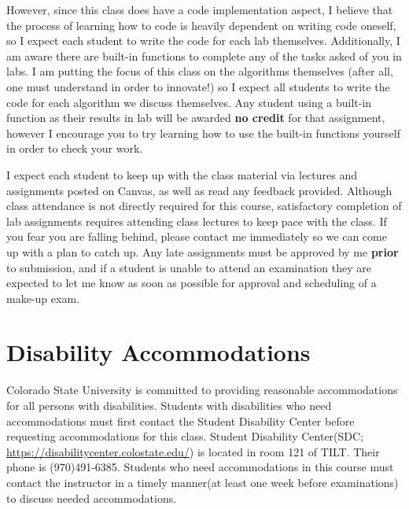 \documentclass[11pt]{article}
\begin{document}
\noindent However, since this class does have a code implementation aspect, I believe that the process of learning how to code is heavily dependent on writing code oneself, so I expect each student to write the code for each lab themselves. Additionally, I am aware there are built-in functions to complete any of the tasks asked of you in labs. I am putting the focus of this class on the algorithms themselves (after all, one must understand in order to innovate!) so I expect all students to write the code for each algorithm we discuss themselves. Any student using a built-in function as their results in lab will be awarded \textbf{no credit} for that assignment, however I encourage you to try learning how to use the built-in functions yourself in order to check your work.

\bigskip

\noindent I expect each student to keep up with the class material via lectures and assignments posted on Canvas, as well as read any feedback provided. Although class attendance is not directly required for this course, satisfactory completion of lab assignments requires attending class lectures to keep pace with the class. If you fear you are falling behind, please contact me immediately so we can come up with a plan to catch up. Any late assignments must be approved by me \textbf{prior} to submission, and if a student is unable to attend an examination they are expected to let me know as soon as possible for approval and scheduling of a make-up exam.

\newpage  

\section*{Disability Accommodations}
Colorado State University is committed to providing reasonable accommodations for all persons with disabilities. Students with disabilities who need accommodations must first contact the Student Disability Center before requesting accommodations for this class. Student Disability Center(SDC; \url{https://disabilitycenter.colostate.edu/}) is located in room 121 of TILT. Their phone is (970)491-6385. Students who need accommodations in this course must contact the instructor in a timely manner(at least one week before examinations) to discuss needed accommodations. 
\end{document}
